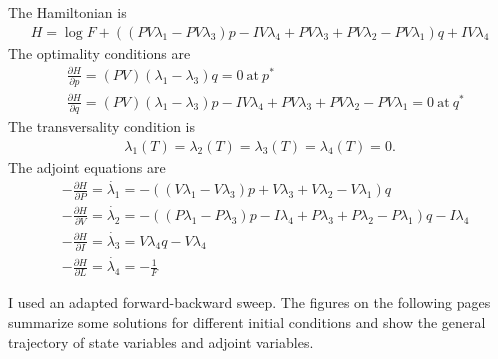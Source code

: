 \documentclass[12pt, oneside]{article}   	%
\begin{document}
\noindent The Hamiltonian is 
%
\begin{align}
H = \log F +
((PV \lambda_1-PV \lambda_3)p-IV \lambda_4+PV \lambda_3+PV \lambda_2-PV \lambda_1)q+IV \lambda_4
\end{align}
%
The optimality conditions are
%
\begin{align}
& \frac{\partial H}{\partial p} = (PV)( \lambda_1 - \lambda_3)q = 0\ \mathrm{at}\ p^* \\
&\frac{\partial H}{\partial q} =  (PV)( \lambda_1- \lambda_3)p-IV \lambda_4+PV \lambda_3+PV \lambda_2-PV \lambda_1 = 0\ \mathrm{at}\ q^*
\end{align}
%
The transversality condition is
%
\begin{align}
\lambda_1(T) = \lambda_2(T) = \lambda_3(T) = \lambda_4(T) = 0.
\end{align}
%
The adjoint equations are
%
\begin{align}
&-\frac{\partial H}{\partial P} = \dot{\lambda_1}  = -((V \lambda_1-V \lambda_3)p+V \lambda_3+V \lambda_2-V \lambda_1)q \nonumber \\
&-\frac{\partial H}{\partial V} = \dot{\lambda_2}  = -((P \lambda_1-P \lambda_3)p-I \lambda_4+P \lambda_3+P \lambda_2-P \lambda_1)q-I \lambda_4  \nonumber\\
&-\frac{\partial H}{\partial I} = \dot{\lambda_3}  = V \lambda_4q-V \lambda_4 \nonumber \\
&-\frac{\partial H}{\partial L} = \dot{\lambda_4}  = -\frac{1}{F}  
\end{align}
%

I used an adapted forward-backward sweep. The figures on the following pages summarize some solutions for different initial conditions and show the general trajectory of state variables and adjoint variables.
\end{document}
